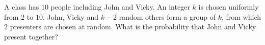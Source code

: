 A class has $10$ people including John and Vicky. An integer $k$ is chosen uniformly from $2$ to $10$. John, Vicky and $k-2$ random others form a group of $k$, from which $2$ presenters are chosen at random. What is the probability that John and Vicky present together?
